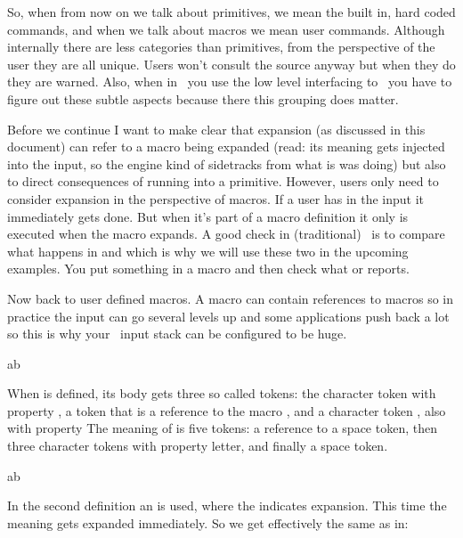 So, when from now on we talk about primitives, we mean the built in, hard coded
commands, and when we talk about macros we mean user commands. Although
internally there are less  categories than primitives, from the
perspective of the user they are all unique. Users won't consult the source
anyway but when they do they are warned. Also, when in \LUAMETATEX\ you use the
low level interfacing to \TEX\ you have to figure out these subtle aspects
because there this grouping does matter.

Before we continue I want to make clear that expansion (as discussed in this
document) can refer to a macro being expanded (read: its meaning gets injected
into the input, so the engine kind of sidetracks from what is was doing) but also
to direct consequences of running into a primitive. However, users only need to
consider expansion in the perspective of macros. If a user has \type {\advance}
in the input it immediately gets done. But when it's part of a macro definition
it only is executed when the macro expands. A good check in (traditional) \TEX\
is to compare what happens in \type {\def} and \type {\edef} which is why we will
use these two in the upcoming examples. You put something in a macro and then
check what \type {\meaning} or \type {\show} reports.

Now back to user defined macros. A macro can contain references to macros so in
practice the input can go several levels up and some applications push back a lot
so this is why your \TEX\ input stack can be configured to be huge.

\starttyping[option=TEX]
\def\MyMacroB{1\MyMacroA 2}

a\MyMacroA b
\stoptyping

When \type {\MyMacroB} is defined, its body gets three so called tokens: the
character token \type {1} with property , a token that is a
reference to the macro \type {\MyMacroB}, and a character token \type {2}, also
with property \quote {other} The meaning of \type {\MyMacroA} is five tokens:
a reference to a space token, then three character tokens with property \quote
{letter}, and finally a space token.

\starttyping[option=TEX]
\edef\MyMacroB{1\MyMacroA 2}

a\MyMacroA b
\stoptyping

In the second definition an \type {\edef} is used, where the  indicates
expansion. This time the meaning gets expanded immediately. So we get effectively the same
as in:

